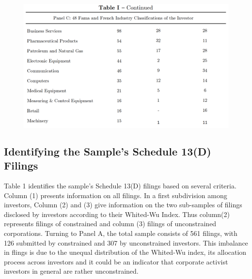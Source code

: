\documentclass[12pt]{article}
\begin{document}
\begin{figure}[!htb]
	\centering
	\begin{adjustbox}{width=\textwidth}
		\includegraphics{Descriptive}
	\end{adjustbox}
\end{figure}

\subsection{Identifying the Sample's Schedule 13(D) Filings}

Table 1 identifies the sample's Schedule 13(D) filings based on several criteria. Column (1) presents information on all filings. In a first subdivision among investors, Column (2) and (3) give information on the two sub-samples of filings disclosed by investors according to their Whited-Wu Index. Thus column(2) represents filings of constrained and column (3) filings of unconstrained corporations.
Turning to Panel A, the total sample consists of 561 filings, with 126 submitted by constrained and 307 by unconstrained investors. This imbalance in flings is due to the unequal distribution of the Whited-Wu index, its allocation process across investors and it could be an indicator that corporate activist investors in general are rather unconstrained.
\end{document}
